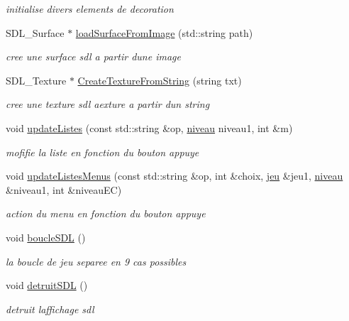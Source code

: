 \begin{DoxyCompactItemize}
\begin{DoxyCompactList}\small\item\em initialise divers elements de decoration \end{DoxyCompactList}\item 
S\+D\+L\+\_\+\+Surface $\ast$ \hyperlink{classaffichageSDL_a13bba158324313457a7153e94625634e}{load\+Surface\+From\+Image} (std\+::string path)
\begin{DoxyCompactList}\small\item\em cree une surface sdl a partir d\textquotesingle{}une image \end{DoxyCompactList}\item 
S\+D\+L\+\_\+\+Texture $\ast$ \hyperlink{classaffichageSDL_ab7a09760e550b45a3801bd7627376ee9}{Create\+Texture\+From\+String} (string txt)
\begin{DoxyCompactList}\small\item\em cree une texture sdl aexture a partir d\textquotesingle{}un string \end{DoxyCompactList}\item 
void \hyperlink{classaffichageSDL_a0cc9cacd83c16fb207dfc6684b2d4962}{update\+Listes} (const std\+::string \&op, \hyperlink{classniveau}{niveau} niveau1, int \&m)
\begin{DoxyCompactList}\small\item\em mofifie la liste en fonction du bouton appuye \end{DoxyCompactList}\item 
void \hyperlink{classaffichageSDL_a3d6d2467ae9f27f2630b9e6c5bf112e4}{update\+Listes\+Menus} (const std\+::string \&op, int \&choix, \hyperlink{classjeu}{jeu} \&jeu1, \hyperlink{classniveau}{niveau} \&niveau1, int \&niveau\+EC)
\begin{DoxyCompactList}\small\item\em action du menu en fonction du bouton appuye \end{DoxyCompactList}\item 
void \hyperlink{classaffichageSDL_add85e8a68ed6ec13abddd28faac32c37}{boucle\+S\+DL} ()\hypertarget{classaffichageSDL_add85e8a68ed6ec13abddd28faac32c37}{}\label{classaffichageSDL_add85e8a68ed6ec13abddd28faac32c37}

\begin{DoxyCompactList}\small\item\em la boucle de jeu separee en 9 cas possibles \end{DoxyCompactList}\item 
void \hyperlink{classaffichageSDL_a5ad77a086c614967394ddc7b630c1442}{detruit\+S\+DL} ()\hypertarget{classaffichageSDL_a5ad77a086c614967394ddc7b630c1442}{}\label{classaffichageSDL_a5ad77a086c614967394ddc7b630c1442}

\begin{DoxyCompactList}\small\item\em detruit l\textquotesingle{}affichage sdl \end{DoxyCompactList}\end{DoxyCompactItemize}


